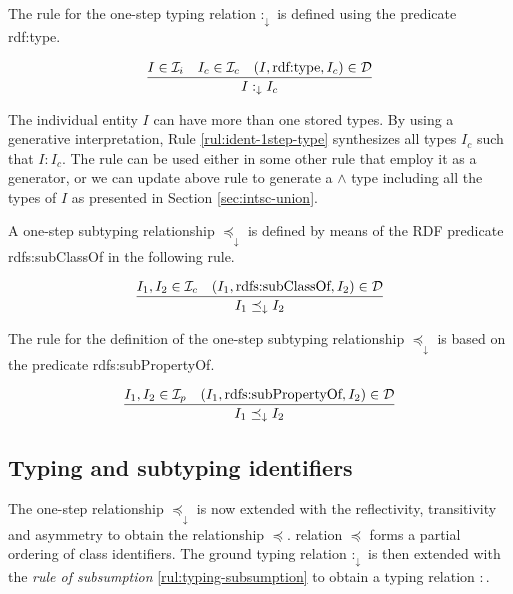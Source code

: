 \documentclass[runningheads]{llncs}
\newcommand{\darr}{\downarrow}
\newcommand{\Ii}{{\cal I}_i}
\newcommand{\Ic}{{\cal I}_c}
\newcommand{\Ip}{{\cal I}_p}
\newcommand{\memo}[1]{}
\newcommand{\notes}[1]{\noindent\begin{small}-- \emph{#1}\\\end{small}}
\begin{document}

\memo{Oportunity to introduce ``mixed'' objects including ground and schema components.}

The rule for the one-step typing relation $:_\darr$ is defined using
the predicate rdf:type.

\begin{equation}
\label{rul:ident-1step-type}
\dfrac{I\in\Ii\quad I_c\in\Ic\quad (I,\text{rdf:type},I_c)\in \D}
      {I :_\darr I_c}
\end{equation}

The individual entity $I$ can have more than one stored types. By
using a generative interpretation, Rule \ref{rul:ident-1step-type}
synthesizes all types $I_c$ such that $I:I_c$. The rule can be used
either in some other rule that employ it as a generator, or we can
update above rule to generate a $\land$ type including all the types
of $I$ as presented in Section \ref{sec:intsc-union}.

A one-step subtyping relationship $\preceq_\darr$ is defined by means
of the RDF predicate rdfs:sub\-ClassOf in the following rule.

\begin{equation}
\dfrac{I_1,I_2\in\Ic \quad (I_1,\text{rdfs:subClassOf},I_2)\in \D}
{I_1 \preceq_\darr\/I_2}
\end{equation}

The rule for the definition of the one-step subtyping relationship
$\preceq_\darr$ is based on the predicate rdfs:subPropertyOf.

\begin{equation}
\dfrac{I_1,I_2\in\Ip \quad (I_1,\text{rdfs:subPropertyOf},I_2)\in \D}
      {I_1\preceq_\darr\/I_2}
\end{equation}





\subsection{Typing and subtyping identifiers\label{sec:idents-typing}}

The one-step relationship $\preceq_\darr$ is now extended with the
reflectivity, transitivity and asymmetry to obtain the relationship
$\preceq$.  relation $\preceq$ forms a partial ordering of class
identifiers. The ground typing relation $:_\darr$ is then extended
with the \emph{rule of subsumption} \ref{rul:typing-subsumption} to
obtain a typing relation $:$.
\end{document}

